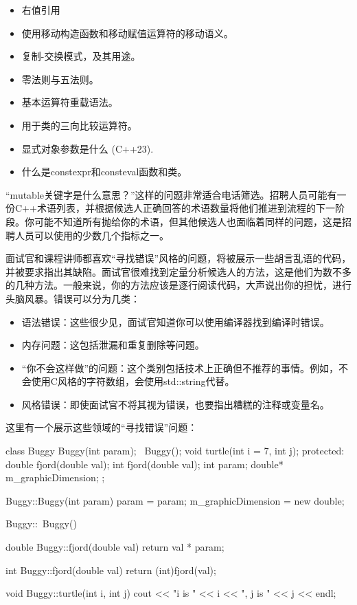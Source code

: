 \begin{itemize}
\item
右值引用

\item
使用移动构造函数和移动赋值运算符的移动语义。

\item
复制-交换模式，及其用途。

\item
零法则与五法则。

\item
基本运算符重载语法。

\item
用于类的三向比较运算符。

\item
显式对象参数是什么 (C++23).

\item
什么是constexpr和consteval函数和类。
\end{itemize}


“mutable关键字是什么意思？”这样的问题非常适合电话筛选。招聘人员可能有一份C++术语列表，并根据候选人正确回答的术语数量将他们推进到流程的下一阶段。你可能不知道所有抛给你的术语，但其他候选人也面临着同样的问题，这是招聘人员可以使用的少数几个指标之一。

面试官和课程讲师都喜欢“寻找错误”风格的问题，将被展示一些胡言乱语的代码，并被要求指出其缺陷。面试官很难找到定量分析候选人的方法，这是他们为数不多的几种方法。一般来说，你的方法应该是逐行阅读代码，大声说出你的担忧，进行头脑风暴。错误可以分为几类：

\begin{itemize}
\item
语法错误：这些很少见，面试官知道你可以使用编译器找到编译时错误。

\item
内存问题：这包括泄漏和重复删除等问题。

\item
“你不会这样做”的问题：这个类别包括技术上正确但不推荐的事情。例如，不会使用C风格的字符数组，会使用std::string代替。

\item
风格错误：即使面试官不将其视为错误，也要指出糟糕的注释或变量名。
\end{itemize}

这里有一个展示这些领域的“寻找错误”问题：

\begin{cpp}
class Buggy
{
    Buggy(int param);
    ~Buggy();
    void turtle(int i = 7, int j);
    protected:
    double fjord(double val);
    int fjord(double val);
    int param;
    double* m_graphicDimension;
};

Buggy::Buggy(int param)
{
    param = param;
    m_graphicDimension = new double;
}

Buggy::~Buggy()
{}

double Buggy::fjord(double val)
{
    return val * param;
}

int Buggy::fjord(double val)
{
    return (int)fjord(val);
}

void Buggy::turtle(int i, int j)
{
    cout << "i is " << i << ", j is " << j << endl;
}
\end{cpp}

